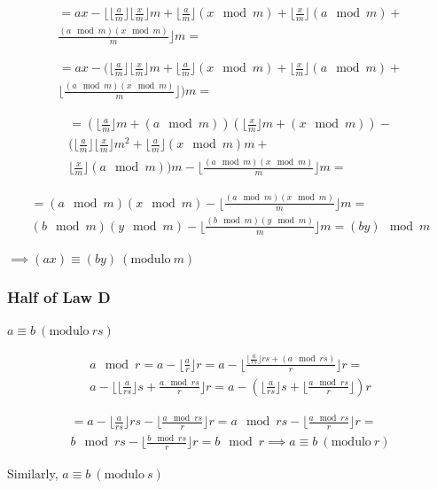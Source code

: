 \documentclass{article}
\begin{document}
\begin{multline*}
= ax - \lfloor \lfloor\frac{a}{m}\rfloor \lfloor\frac{x}{m}\rfloor m + \lfloor\frac{a}{m}\rfloor (x \mod m) + \lfloor\frac{x}{m}\rfloor (a \mod m) + \\
\frac{(a \mod m)(x \mod m)}{m} \rfloor m =
\end{multline*}

\begin{multline*}
= ax - (\lfloor\frac{a}{m}\rfloor \lfloor\frac{x}{m}\rfloor m + \lfloor\frac{a}{m}\rfloor (x \mod m) + \lfloor\frac{x}{m}\rfloor (a \mod m) + \\
\lfloor \frac{(a \mod m)(x \mod m)}{m} \rfloor) m =
\end{multline*}

\begin{multline*}
= (\lfloor\frac{a}{m}\rfloor m + (a \mod m))(\lfloor\frac{x}{m}\rfloor m + (x \mod m)) - \\
(\lfloor\frac{a}{m}\rfloor \lfloor\frac{x}{m}\rfloor m^{2} + \lfloor\frac{a}{m}\rfloor (x \mod m) m + \\
\lfloor\frac{x}{m} \rfloor (a \mod m)) m - \lfloor \frac{(a \mod m)(x \mod m)}{m} \rfloor m =
\end{multline*}

\begin{multline*}
= (a \mod m) (x \mod m) -  \lfloor \frac{(a \mod m)(x \mod m)}{m} \rfloor m = \\
(b \mod m) (y \mod m) -  \lfloor \frac{(b \mod m)(y \mod m)}{m} \rfloor m = (by) \mod m
\end{multline*}

\( \implies (ax) \equiv (by)\ (\mathrm{modulo}\ m) \)

\subsubsection*{Half of Law D}

\( a \equiv b\ (\mathrm{modulo}\ rs) \)

\begin{multline*}
a \mod r = a - \lfloor \frac{a}{r} \rfloor r = a - \lfloor \frac{\lfloor\frac{a}{rs} \rfloor rs + (a \mod rs)}{r} \rfloor r = \\
a - \lfloor \lfloor\frac{a}{rs} \rfloor s +  \frac{a \mod rs}{r} \rfloor r = a - (\lfloor\frac{a}{rs} \rfloor s + \lfloor \frac{a \mod rs}{r} \rfloor)r
\end{multline*}

\begin{multline*}
= a - \lfloor\frac{a}{rs} \rfloor rs - \lfloor \frac{a \mod rs}{r} \rfloor r = a \mod rs - \lfloor \frac{a \mod rs}{r} \rfloor r = \\
b \mod rs - \lfloor \frac{b \mod rs}{r} \rfloor r = b \mod r \implies a \equiv b\ (\mathrm{modulo}\ r)
\end{multline*}

Similarly, \( a \equiv b\ (\mathrm{modulo}\ s) \)
\end{document}
